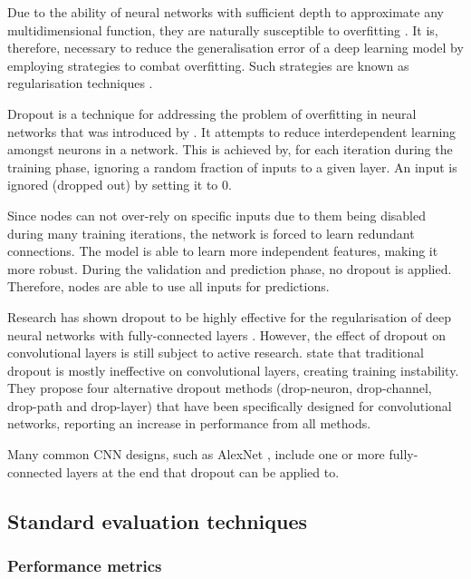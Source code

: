 \documentclass{l4proj}
\begin{document}
Due to the ability of neural networks with sufficient depth to approximate any multidimensional function, they are naturally susceptible to overfitting \citep{tetko_neural_1995}. It is, therefore, necessary to reduce the generalisation error of a deep learning model by employing strategies to combat overfitting. Such strategies are known as regularisation techniques \citep{goodfellow_deep_2016}.

Dropout is a technique for addressing the problem of overfitting in neural networks that was introduced by \citet{srivastava_dropout_2014}. It attempts to reduce interdependent learning amongst neurons in a network. This is achieved by, for each iteration during the training phase, ignoring a random fraction of inputs to a given layer. An input is ignored (dropped out) by setting it to 0.

Since nodes can not over-rely on specific inputs due to them being disabled during many training iterations, the network is forced to learn redundant connections. The model is able to learn more independent features, making it more robust. During the validation and prediction phase, no dropout is applied. Therefore, nodes are able to use all inputs for predictions.

Research has shown dropout to be highly effective for the regularisation of deep neural networks with fully-connected layers \citep{wu_towards_2015}. However, the effect of dropout on convolutional layers is still subject to active research. \citet{cai_effective_2019} state that traditional dropout is mostly ineffective on convolutional layers, creating training instability. They propose four alternative dropout methods (drop-neuron, drop-channel, drop-path and drop-layer) that have been specifically designed for convolutional networks, reporting an increase in performance from all methods. 

Many common CNN designs, such as AlexNet \citep{krizhevsky_imagenet_2012}, include one or more fully-connected layers at the end that dropout can be applied to. 

\subsection{Standard evaluation techniques}

\subsubsection{Performance metrics}
\end{document}
